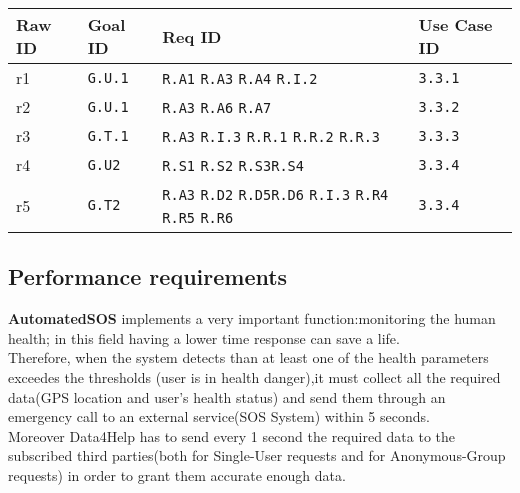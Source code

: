 \begin{table}[h!]
   \centering
    \begin{tabularx}{\linewidth}{|X|X|X|X|}
         \hline
         \textbf{Raw ID} & \textbf{Goal ID} & \textbf{Req ID} & \textbf{Use Case ID} \\
	\hline
	r1 & \texttt{G.U.1} & \texttt{R.A1}  \newline \texttt{R.A3}  \newline \texttt{R.A4} \newline \texttt{R.I.2}& \texttt{3.3.1} \\
	\hline
	r2 & \texttt{G.U.1} & \texttt{R.A3}  \newline \texttt{R.A6}  \newline \texttt{R.A7} & \texttt{3.3.2}  \\
	\hline
	r3 & \texttt{G.T.1} & \texttt{R.A3}  \newline \texttt{R.I.3}  \newline \texttt{R.R.1} \newline \texttt{R.R.2} \newline \texttt{R.R.3}& \texttt{3.3.3}  \\
\hline
r4 & \texttt{G.U2} & \texttt{R.S1} \newline  \texttt{R.S2} \newline \texttt{R.S3}\newline \texttt{R.S4} & \texttt{3.3.4}   \\
\hline
r5 & \texttt{G.T2} & \texttt{R.A3} \newline  \texttt{R.D2} \newline \texttt{R.D5}\newline \texttt{R.D6}  \newline \texttt{R.I.3} \newline \texttt{R.R4}  \newline \texttt{R.R5}  \newline \texttt{R.R6} & \texttt{3.3.4}   \\
\hline
	\end{tabularx}
      \end{table}
  \subsection{Performance requirements}
\textbf{AutomatedSOS} implements a very important function:monitoring the human health; in this field having a lower time response can save a life.\\ Therefore, when the system detects than at least one of the health parameters exceedes the thresholds (user is in health danger),it must collect all the required data(GPS location and user's health status) and send them through an emergency call to an external service(SOS System) within 5 seconds.\\
Moreover Data4Help has to send every 1 second the required data to the subscribed third parties(both for Single-User requests and for Anonymous-Group requests) in order to grant them accurate enough data.
